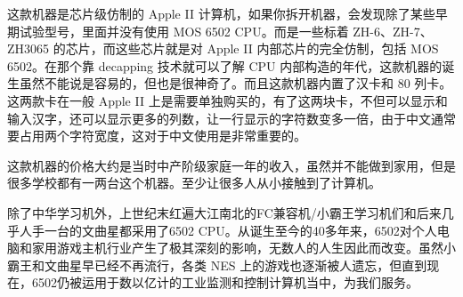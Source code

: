 这款机器是芯片级仿制的 Apple II 计算机，如果你拆开机器，会发现除了某些早期试验型号，里面并没有使用 MOS 6502 CPU。而是一些标着 ZH-6、ZH-7、ZH3065 的芯片，而这些芯片就是对 Apple II 内部芯片的完全仿制，包括 MOS 6502。在那个靠 decapping 技术就可以了解 CPU 内部构造的年代，这款机器的诞生虽然不能说是容易的，但也是很神奇了。而且这款机器内置了汉卡和 80 列卡。这两款卡在一般 Apple II 上是需要单独购买的，有了这两块卡，不但可以显示和输入汉字，还可以显示更多的列数，让一行显示的字符数变多一倍，由于中文通常要占用两个字符宽度，这对于中文使用是非常重要的。

这款机器的价格大约是当时中产阶级家庭一年的收入，虽然并不能做到家用，但是很多学校都有一两台这个机器。至少让很多人从小接触到了计算机。

除了中华学习机外，上世纪末红遍大江南北的FC兼容机/小霸王学习机们和后来几乎人手一台的文曲星都采用了6502 CPU。从诞生至今的40多年来，6502对个人电脑和家用游戏主机行业产生了极其深刻的影响，无数人的人生因此而改变。虽然小霸王和文曲星早已经不再流行，各类 NES 上的游戏也逐渐被人遗忘，但直到现在，6502仍被运用于数以亿计的工业监测和控制计算机当中，为我们服务。
